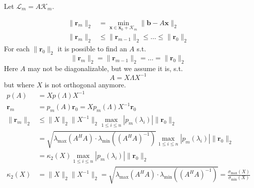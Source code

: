 Let $\mathcal{L}_m = A\mathcal{K}_m$.

\begin{align*}
    \|\mathbf{r}_m\|_2 & = \min_{\mathbf{x} \in \mathbf{x}_0 + \mathcal{K}_m} \|\mathbf{b} - A\mathbf{x}\|_2 \\
    \|\mathbf{r}_m\|_2 & \leq \|\mathbf{r}_{m-1}\|_2 \leq \ldots \leq \|\mathbf{r}_0\|_2
\end{align*}
For each $\|\mathbf{r}_0\|_2$ it is possible to find an $A$ s.t.
\[
    \|\mathbf{r}_m\|_2 = \|\mathbf{r}_{m-1}\|_2 = \ldots = \|\mathbf{r}_0\|_2
\]
Here $A$ may not be diagonalizable, but we assume it is, s.t.
\[
    A = X\Lambda X^{-1}
\]
but where $X$ is not orthogonal anymore.
\begin{align*}
    p(A)               & = Xp(\Lambda)X^{-1}                                                                                                                 \\
    \mathbf{r}_m       & = p_m(A)\mathbf{r}_0 = Xp_m(\Lambda)X^{-1}\mathbf{r}_0                                                                              \\
    \|\mathbf{r}_m\|_2 & \leq \|X\|_2 \|X^{-1}\|_2 \max_{1 \leq i \leq n} |p_m(\lambda_i)| \|\mathbf{r}_0\|_2                                                \\
                       & = \sqrt{\lambda_{\max}(A^H A) \cdot \lambda_{\min}((A^H A)^{-1})} \max_{1 \leq i \leq n} |p_m(\lambda_i)| \|\mathbf{r}_0\|_2        \\
                       & = \kappa_2(X) \max_{1 \leq i \leq n} |p_m(\lambda_i)| \|\mathbf{r}_0\|_2                                                            \\
    \kappa_2(X)        & = \|X\|_2 \|X^{-1}\|_2 = \sqrt{\lambda_{\max}(A^H A)\cdot \lambda_{\min}((A^H A)^{-1})} = \frac{\sigma_{\max}(X)}{\sigma_{\min}(X)}
\end{align*}

